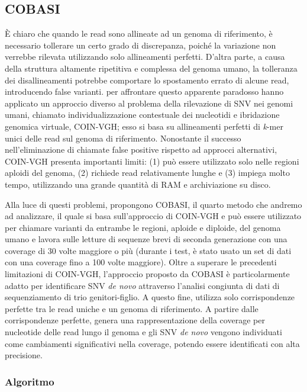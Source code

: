 \documentclass[../main.tex]{subfiles}
\begin{document}
\subsection{COBASI}
\label{cobasi}
 
È chiaro che quando le read sono allineate ad un genoma di riferimento, è necessario tollerare un certo grado di discrepanza, poiché la variazione non verrebbe rilevata utilizzando solo allineamenti perfetti. D'altra parte, a causa della struttura altamente ripetitiva e complessa del genoma umano, la tolleranza dei disallineamenti potrebbe comportare lo spostamento errato di alcune read, introducendo false varianti. \cite{gomez-romero2018cobasi} per affrontare questo apparente paradosso hanno applicato un approccio diverso al problema della rilevazione di SNV nei genomi umani, chiamato individualizzazione contestuale dei nucleotidi e ibridazione genomica virtuale, COIN-VGH; esso si basa su allineamenti perfetti di \textit{k}-mer unici delle read sul genoma di riferimento. Nonostante il successo nell'eliminazione di chiamate false positive rispetto ad approcci alternativi, COIN-VGH presenta importanti limiti: (1) può essere utilizzato solo nelle regioni aploidi del genoma, (2) richiede read relativamente lunghe e (3) impiega molto tempo,  utilizzando una grande quantità di RAM e archiviazione su disco.

Alla luce di questi problemi, \cite{gomez-romero2018cobasi} propongono COBASI, il quarto metodo che andremo ad analizzare, il quale si basa sull'approccio di COIN-VGH e può essere utilizzato per chiamare varianti da entrambe le regioni, aploide e diploide, del genoma umano e lavora sulle letture di sequenze brevi di seconda generazione con una coverage di 30 volte maggiore o più (durante i test, è stato usato un set di dati con una coverage fino a 100 volte maggiore). Oltre a superare le precedenti limitazioni di COIN-VGH, l'approccio proposto da COBASI è particolarmente adatto per identificare SNV \textit{de novo} attraverso l'analisi congiunta di dati di sequenziamento di trio genitori-figlio. A questo fine, utilizza solo corrispondenze perfette tra le read uniche e un genoma di riferimento. A partire dalle corrispondenze perfette, genera una rappresentazione della coverage per nucleotide delle read lungo il genoma e gli SNV \textit{de novo} vengono individuati come cambiamenti significativi nella coverage, potendo essere identificati con alta precisione.  


\subsubsection{Algoritmo}
\end{document}
